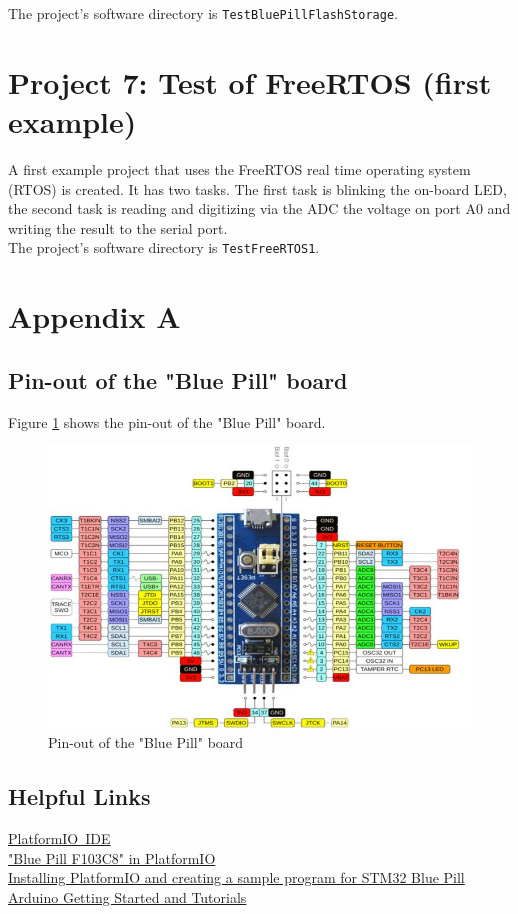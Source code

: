\documentclass[11pt, oneside]{scrartcl}   	%
\begin{document}
The project's software directory is \verb!TestBluePillFlashStorage!.


\newpage
\section{Project 7: Test of FreeRTOS (first example)}
A first example project that uses the FreeRTOS real time operating system (RTOS) is created. It has two tasks. The first task is blinking the on-board LED, the second task is reading
and digitizing via the ADC the voltage on port A0 and writing the result to the serial port.\\
 
The project's software directory is \verb!TestFreeRTOS1!.


\newpage
\appendix
\section{Appendix A}
\subsection{Pin-out of the "Blue Pill" board}
Figure \ref{fig:BluePillPinout} shows the pin-out of the "Blue Pill" board.
\begin{figure}[htbp]
	\centering
	\includegraphics[width=1.0\linewidth]{Figures/STM32-Blue-Pill-Development-Board-Pinout.jpg}
	\caption{Pin-out of the "Blue Pill" board}
	\label{fig:BluePillPinout}
\end{figure}

\subsection{Helpful Links}
\href{https://platformio.org/platformio-ide}{PlatformIO IDE}\\
\href{https://docs.platformio.org/en/latest//boards/ststm32/bluepill_f103c8.html}{"Blue Pill F103C8" in PlatformIO}\\
\href{https://www.youtube.com/watch?v=cmHQxd_qGl8}{Installing PlatformIO and creating a sample program for STM32 Blue Pill}\\
\href{https://www.arduino.cc/en/Tutorial/HomePage}{Arduino Getting Started and Tutorials}
\end{document}
